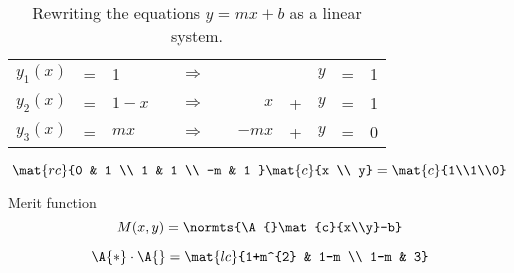 
  \begin{table}[htbp]
  \caption{Rewriting the equations $y=mx+b$ as a linear system.}
  \begin{center}
    \begin{tabular}{lclcccrcrcl}
      $y_{1}(x)$ &=&  1       && $\Rightarrow$ && &&          $y$ &=& 1 \\
      $y_{2}(x)$ &=&  $1 - x$ && $\Rightarrow$ && $x$   & + & $y$ &=& 1 \\
      $y_{3}(x)$ &=&  $m x$   && $\Rightarrow$ && $-mx$ & + & $y$ &=& 0 \\
    \end{tabular}
  \end{center}
  \end{table}%


  \begin{equation*}   %
      \mat{rc}{0 & 1 \\ 1 & 1 \\ -m & 1 } 
      \mat{c}{x \\ y} = 
      \mat{c}{1\\1\\0}
  \end{equation*}

Merit function
  \begin{equation*}   %
      M(x,y) = \normts{\A{}\mat{c}{x\\y}-b}
  \end{equation*}

  \begin{equation*}   %
      \A{*} \cdot \A{} = 
      \mat{lc}{1+m^{2} & 1-m \\ 1-m & 3}
  \end{equation*}

